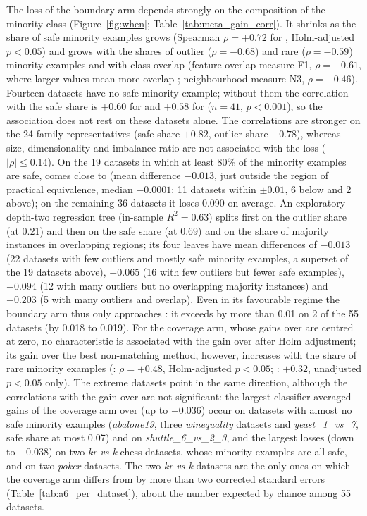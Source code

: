 The loss of the boundary arm depends strongly on the composition of the minority class (Figure~\ref{fig:when}; Table~\ref{tab:meta_gain_corr}). It shrinks as the share of safe minority examples \citep{napierala2016types} grows (Spearman $\rho=+0.72$ for \MUSBS, Holm-adjusted $p<0.05$) and grows with the shares of outlier ($\rho=-0.68$) and rare ($\rho=-0.59$) minority examples and with class overlap (feature-overlap measure F1, $\rho=-0.61$, where larger values mean more overlap \citep{lorena2020how}; neighbourhood measure N3, $\rho=-0.46$). Fourteen datasets have no safe minority example; without them the correlation with the safe share is $+0.60$ for \MUSBS{} and $+0.58$ for \MUSBO{} ($n=41$, $p<0.001$), so the association does not rest on these datasets alone. The correlations are stronger on the 24 family representatives (safe share $+0.82$, outlier share $-0.78$), whereas size, dimensionality and imbalance ratio are not associated with the loss ($|\rho|\le0.14$). On the 19 datasets in which at least 80\% of the minority examples are safe, \MUSBS{} comes close to \RUS{} (mean difference $-0.013$, just outside the region of practical equivalence, median $-0.0001$; 11 datasets within $\pm0.01$, 6 below and 2 above); on the remaining 36 datasets it loses 0.090 on average. An exploratory depth-two regression tree (in-sample $R^2=0.63$) splits first on the outlier share (at 0.21) and then on the safe share (at 0.69) and on the share of majority instances in overlapping regions; its four leaves have mean differences of $-0.013$ (22 datasets with few outliers and mostly safe minority examples, a superset of the 19 datasets above), $-0.065$ (16 with few outliers but fewer safe examples), $-0.094$ (12 with many outliers but no overlapping majority instances) and $-0.203$ (5 with many outliers and overlap). Even in its favourable regime the boundary arm thus only approaches \RUS: it exceeds \RUS{} by more than 0.01 on 2 of the 55 datasets (by 0.018 to 0.019). For the coverage arm, whose gains over \RUS{} are centred at zero, no characteristic is associated with the gain over \RUS{} after Holm adjustment; its gain over the best non-matching method, however, increases with the share of rare minority examples (\MUSCS: $\rho=+0.48$, Holm-adjusted $p<0.05$; \MUSCO: $+0.32$, unadjusted $p<0.05$ only). The extreme datasets point in the same direction, although the correlations with the gain over \RUS{} are not significant: the largest classifier-averaged gains of the coverage arm over \RUS{} (up to $+0.036$) occur on datasets with almost no safe minority examples (\emph{abalone19}, three \emph{winequality} datasets and \emph{yeast\_1\_vs\_7}, safe share at most 0.07) and on \emph{shuttle\_6\_vs\_2\_3}, and the largest losses (down to $-0.038$) on two \emph{kr-vs-k} chess datasets, whose minority examples are all safe, and on two \emph{poker} datasets. The two \emph{kr-vs-k} datasets are the only ones on which the coverage arm differs from \RUS{} by more than two corrected standard errors (Table~\ref{tab:a6_per_dataset}), about the number expected by chance among 55 datasets.

